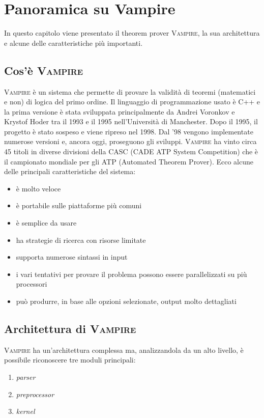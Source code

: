 \chapter{Panoramica su Vampire}
In questo capitolo viene presentato il theorem prover \textsc{Vampire}, la sua architettura e alcune
delle caratteristiche più importanti.

\section{Cos'è \textsc{Vampire}}
\textsc{Vampire} è un sistema che permette di provare la validità di teoremi (matematici e non) di logica del primo ordine. 
Il linguaggio di programmazione usato è C++ e la prima versione è stata sviluppata principalmente 
da Andrei Voronkov e Krystof Hoder tra il 1993 e il 1995 nell'Università di Manchester. Dopo il 1995, 
il progetto è stato sospeso e viene ripreso nel 1998. Dal '98 vengono implementate numerose versioni e, 
ancora oggi, proseguono gli sviluppi. \textsc{Vampire} ha vinto circa 45 titoli in diverse divisioni 
della CASC (CADE ATP System Competition) che è il campionato mondiale per gli ATP (Automated Theorem Prover).
Ecco alcune delle principali caratteristiche del sistema:
\begin{itemize}
    \item è molto veloce
    \item è portabile sulle piattaforme più comuni
    \item è semplice da usare
    \item ha strategie di ricerca con risorse limitate
    \item supporta numerose sintassi in input
    \item i vari tentativi per provare il problema possono essere parallelizzati su più processori
    \item può produrre, in base alle opzioni selezionate, output molto dettagliati 
\end{itemize}
\section{Architettura di \textsc{Vampire}}
\textsc{Vampire} ha un'architettura complessa ma, analizzandola da un alto livello, è possibile riconoscere tre moduli 
principali:
\begin{enumerate}
    \item \emph{parser}
    \item \emph{preprocessor}
    \item \emph{kernel}
\end{enumerate}
\begin{figure}[H]
\end{figure}


